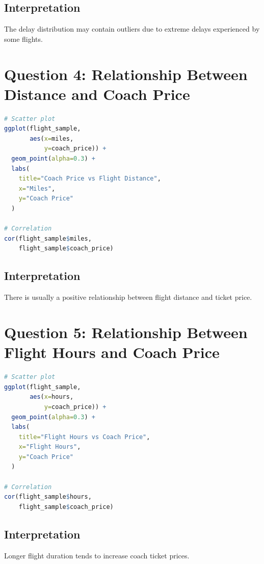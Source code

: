 \documentclass[12pt,a4paper]{article}
\begin{document}
\subsection{Interpretation}
The delay distribution may contain outliers due to extreme delays experienced by some flights.

\section{Question 4: Relationship Between Distance and Coach Price}

\begin{lstlisting}[language=R, caption=Distance vs Coach Price]
# Scatter plot
ggplot(flight_sample,
       aes(x=miles,
           y=coach_price)) +
  geom_point(alpha=0.3) +
  labs(
    title="Coach Price vs Flight Distance",
    x="Miles",
    y="Coach Price"
  )

# Correlation
cor(flight_sample$miles,
    flight_sample$coach_price)
\end{lstlisting}

\subsection{Interpretation}
There is usually a positive relationship between flight distance and ticket price.

\section{Question 5: Relationship Between Flight Hours and Coach Price}

\begin{lstlisting}[language=R, caption=Flight Hours vs Coach Price]
# Scatter plot
ggplot(flight_sample,
       aes(x=hours,
           y=coach_price)) +
  geom_point(alpha=0.3) +
  labs(
    title="Flight Hours vs Coach Price",
    x="Flight Hours",
    y="Coach Price"
  )

# Correlation
cor(flight_sample$hours,
    flight_sample$coach_price)
\end{lstlisting}

\subsection{Interpretation}
Longer flight duration tends to increase coach ticket prices.
\end{document}
